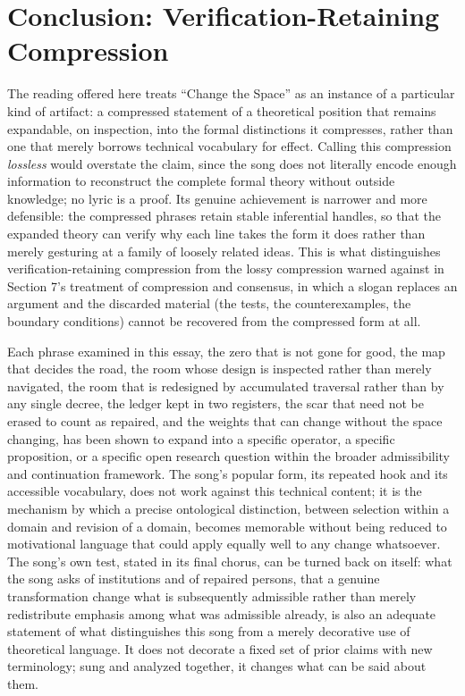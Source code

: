 \documentclass[11pt]{article}
\begin{document}
\section{Conclusion: Verification-Retaining Compression}

The reading offered here treats ``Change the Space'' as an instance of a particular kind of artifact: a compressed statement of a theoretical position that remains expandable, on inspection, into the formal distinctions it compresses, rather than one that merely borrows technical vocabulary for effect. Calling this compression \emph{lossless} would overstate the claim, since the song does not literally encode enough information to reconstruct the complete formal theory without outside knowledge; no lyric is a proof. Its genuine achievement is narrower and more defensible: the compressed phrases retain stable inferential handles, so that the expanded theory can verify why each line takes the form it does rather than merely gesturing at a family of loosely related ideas. This is what distinguishes verification-retaining compression from the lossy compression warned against in Section 7's treatment of compression and consensus, in which a slogan replaces an argument and the discarded material (the tests, the counterexamples, the boundary conditions) cannot be recovered from the compressed form at all.

Each phrase examined in this essay, the zero that is not gone for good, the map that decides the road, the room whose design is inspected rather than merely navigated, the room that is redesigned by accumulated traversal rather than by any single decree, the ledger kept in two registers, the scar that need not be erased to count as repaired, and the weights that can change without the space changing, has been shown to expand into a specific operator, a specific proposition, or a specific open research question within the broader admissibility and continuation framework. The song's popular form, its repeated hook and its accessible vocabulary, does not work against this technical content; it is the mechanism by which a precise ontological distinction, between selection within a domain and revision of a domain, becomes memorable without being reduced to motivational language that could apply equally well to any change whatsoever. The song's own test, stated in its final chorus, can be turned back on itself: what the song asks of institutions and of repaired persons, that a genuine transformation change what is subsequently admissible rather than merely redistribute emphasis among what was admissible already, is also an adequate statement of what distinguishes this song from a merely decorative use of theoretical language. It does not decorate a fixed set of prior claims with new terminology; sung and analyzed together, it changes what can be said about them.
\end{document}
